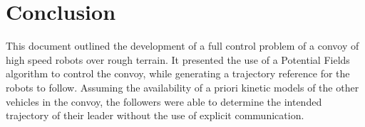 \chapter{Conclusion}
This document outlined the development of a full control problem of a convoy of high speed robots over rough terrain. It presented the use of a Potential Fields algorithm to control the convoy, while generating a trajectory reference for the robots to follow. Assuming the availability of a priori kinetic models of the other vehicles in the convoy, the followers were able to determine the intended trajectory of their leader without the use of explicit communication.

